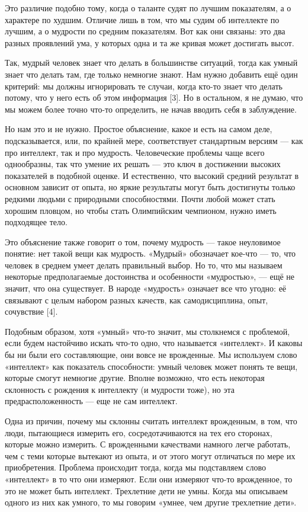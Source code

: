 \documentclass[ebook,12pt,oneside,openany]{memoir}
\begin{document}
Это различие подобно тому, когда о таланте судят по лучшим
показателям, а о характере по худшим. Отличие лишь в том, что мы судим
об интеллекте по лучшим, а о мудрости по средним показателям. Вот как
они связаны: это два разных проявлений ума, у которых одна и та же
кривая может достигать высот.

Так, мудрый человек знает что делать в большинстве ситуаций, тогда как
умный знает что делать там, где только немногие знают. Нам нужно
добавить ещё один критерий: мы должны игнорировать те случаи, когда
кто-то знает что делать потому, что у него есть об этом информация
[3]. Но в остальном, я не думаю, что мы можем более точно что-то
определить, не начав вводить себя в заблуждение.

Но нам это и не нужно. Простое объяснение, какое и есть на самом деле,
подсказывается, или, по крайней мере, соответствует стандартным
версиям — как про интеллект, так и про мудрость. Человеческие проблемы
чаще всего однообразны, так что умение их решать — это ключ в
достижении высоких показателей в подобной оценке. И естественно, что
высокий средний результат в основном зависит от опыта, но яркие
результаты могут быть достигнуты только редкими людьми с природными
способностями. Почти любой может стать хорошим пловцом, но чтобы стать
Олимпийским чемпионом, нужно иметь подходящее тело.

Это объяснение также говорит о том, почему мудрость — такое неуловимое
понятие: нет такой вещи как мудрость. «Мудрый» обозначает кое-что —
то, что человек в среднем умеет делать правильный выбор. Но то, что мы
называем некоторые предполагаемые достоинства и особенности
«мудростью», — ещё не значит, что она существует. В народе «мудрость»
означает все что угодно: её связывают с целым набором разных качеств,
как самодисциплина, опыт, сочувствие [4].

Подобным образом, хотя «умный» что-то значит, мы столкнемся с
проблемой, если будем настойчиво искать что-то одно, что называется
«интеллект». И каковы бы ни были его составляющие, они вовсе не
врожденные. Мы используем слово «интеллект» как показатель
способности: умный человек может понять те вещи, которые смогут
немногие другие. Вполне возможно, что есть некоторая склонность с
рождения к интеллекту (и мудрости тоже), но эта предрасположенность —
еще не сам интеллект.

Одна из причин, почему мы склонны считать интеллект врожденным, в том,
что люди, пытающиеся измерить его, сосредотачиваются на тех его
сторонах, которые можно измерить. С врожденными качествами намного
легче работать, чем с теми которые вытекают из опыта, и от этого могут
отличаться по мере их приобретения. Проблема происходит тогда, когда
мы подставляем слово «интеллект» в то что они измеряют. Если они
измеряют что-то врожденное, то это не может быть интеллект. Трехлетние
дети не умны. Когда мы описываем одного из них как умного, то мы
говорим «умнее, чем другие трехлетние дети».
\end{document}
